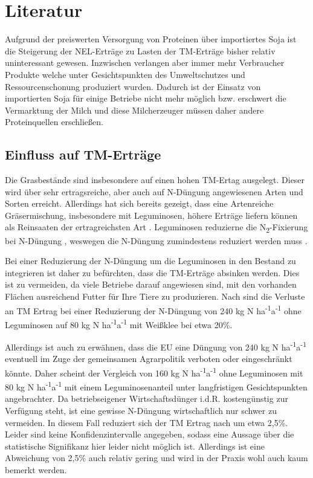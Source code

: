
\section{Literatur}
\label{sec:Literatur}

Aufgrund der preiswerten Versorgung von Proteinen über importiertes Soja ist die Steigerung der \ac{NEL}-Erträge zu Lasten der \ac{TM}-Erträge bisher relativ uninteressant gewesen.
Inzwischen verlangen aber immer mehr Verbraucher Produkte welche unter Gesichtspunkten des Umweltschutzes und Ressourcenschonung produziert wurden.
Dadurch ist der Einsatz von importierten Soja für einige Betriebe nicht mehr möglich bzw. erschwert die Vermarktung der Milch und diese Milcherzeuger müssen daher andere Proteinquellen erschließen.

\subsection{Einfluss auf TM-Erträge}
\label{subsec:TM}

Die Grasbestände sind insbesondere auf einen hohen \ac{TM}-Ertag ausgelegt.
Dieser wird über sehr ertragsreiche, aber auch auf N-Düngung angewiesenen Arten und Sorten erreicht.
Allerdings hat sich bereits gezeigt, dass eine Artenreiche Gräsermischung, insbesondere mit Leguminosen, höhere Erträge liefern können als Reinsaaten der ertragreichsten Art \parencite{nyfeler2009strong}.
Leguminosen reduzierne die N\textsubscript{2}-Fixierung bei N-Düngung \parencite{ledgard2001nitrogen}, weswegen die N-Düngung zumindestens reduziert werden muss \parencite[34]{weggler2050leguminosen}.

Bei einer Reduzierung der N-Düngung um die Leguminosen in den Bestand zu integrieren ist daher zu befürchten, dass die \ac{TM}-Erträge absinken werden.
Dies ist zu vermeiden, da viele Betriebe darauf angewiesen sind, mit den vorhanden Flächen ausreichend Futter für Ihre Tiere zu produzieren.
Nach \textcite[11]{engel2013protein} sind die Verluste an \ac{TM} Ertrag bei einer Reduzierung der N-Düngung von 240 kg N ha\textsuperscript{-1}a\textsuperscript{-1} ohne Leguminosen auf 80 kg N ha\textsuperscript{-1}a\textsuperscript{-1} mit Weißklee bei etwa 20\%.

Allerdings ist auch zu erwähnen, dass die \ac{EU} eine Düngung von 240 kg N ha\textsuperscript{-1}a\textsuperscript{-1} eventuell im Zuge der gemeinsamen Agrarpolitik verboten oder eingeschränkt könnte.
Daher scheint der Vergleich von 160 kg N ha\textsuperscript{-1}a\textsuperscript{-1} ohne Leguminosen mit 80 kg N ha\textsuperscript{-1}a\textsuperscript{-1} mit einem Leguminosenanteil unter langfristigen Gesichtspunkten angebrachter.
Da betriebseigener Wirtschaftsdünger i.d.R. kostengünstig zur Verfügung steht, ist eine gewisse N-Düngung wirtschaftlich nur schwer zu vermeiden.
In diesem Fall reduziert sich der \ac{TM} Ertrag nach \textcite[11]{engel2013protein} um etwa 2,5\%.
Leider sind keine Konfidenzintervalle angegeben, sodass eine Aussage über die statistische Signifikanz hier leider nicht möglich ist.
Allerdings ist eine Abweichung von 2,5\% auch relativ gering und wird in der Praxis wohl auch kaum bemerkt werden.

